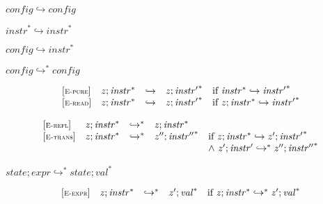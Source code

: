 $\boxed{{\mathit{config}} \hookrightarrow {\mathit{config}}}$

$\boxed{{{\mathit{instr}}^\ast} \hookrightarrow {{\mathit{instr}}^\ast}}$

$\boxed{{\mathit{config}} \hookrightarrow {{\mathit{instr}}^\ast}}$

$\boxed{{\mathit{config}} \hookrightarrow^\ast {\mathit{config}}}$

$$
\begin{array}{@{}l@{}lcl@{}l@{}}
{[\textsc{\scriptsize E{-}pure}]} \quad & {\mathit{z}} ; {{\mathit{instr}}^\ast} &\hookrightarrow& {\mathit{z}} ; {{\mathit{instr}'}^\ast} &\quad
  \mbox{if}~{{\mathit{instr}}^\ast} \hookrightarrow {{\mathit{instr}'}^\ast} \\
{[\textsc{\scriptsize E{-}read}]} \quad & {\mathit{z}} ; {{\mathit{instr}}^\ast} &\hookrightarrow& {\mathit{z}} ; {{\mathit{instr}'}^\ast} &\quad
  \mbox{if}~{\mathit{z}} ; {{\mathit{instr}}^\ast} \hookrightarrow {{\mathit{instr}'}^\ast} \\
\end{array}
$$

$$
\begin{array}{@{}l@{}lcl@{}l@{}}
{[\textsc{\scriptsize E{-}refl}]} \quad & {\mathit{z}} ; {{\mathit{instr}}^\ast} &\hookrightarrow^\ast& {\mathit{z}} ; {{\mathit{instr}}^\ast} &  \\
{[\textsc{\scriptsize E{-}trans}]} \quad & {\mathit{z}} ; {{\mathit{instr}}^\ast} &\hookrightarrow^\ast& {\mathit{z}''} ; {{{\mathit{instr}}''}^\ast} &\quad
  \mbox{if}~{\mathit{z}} ; {{\mathit{instr}}^\ast} \hookrightarrow {\mathit{z}'} ; {{{\mathit{instr}}'}^\ast} \\
 &&&&\quad {\land}~{\mathit{z}'} ; {{\mathit{instr}}'} \hookrightarrow^\ast {\mathit{z}''} ; {{{\mathit{instr}}''}^\ast} \\
\end{array}
$$

\vspace{1ex}

$\boxed{{\mathit{state}} ; {\mathit{expr}} \hookrightarrow^\ast {\mathit{state}} ; {{\mathit{val}}^\ast}}$

$$
\begin{array}{@{}l@{}lcl@{}l@{}}
{[\textsc{\scriptsize E{-}expr}]} \quad & {\mathit{z}} ; {{\mathit{instr}}^\ast} &\hookrightarrow^\ast& {\mathit{z}'} ; {{\mathit{val}}^\ast} &\quad
  \mbox{if}~{\mathit{z}} ; {{\mathit{instr}}^\ast} \hookrightarrow^\ast {\mathit{z}'} ; {{\mathit{val}}^\ast} \\
\end{array}
$$

